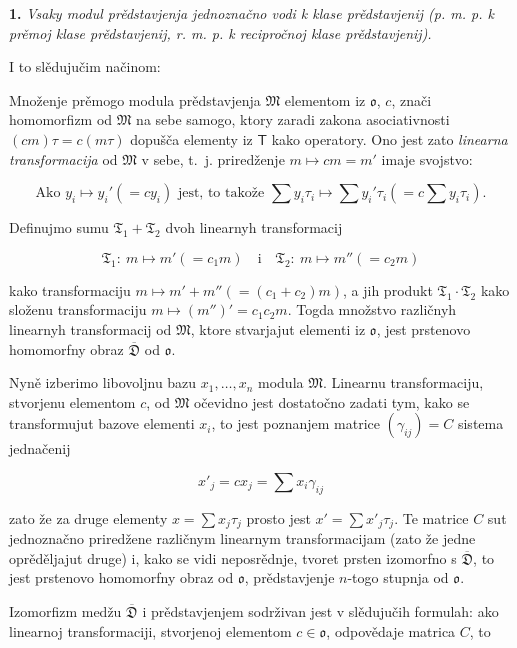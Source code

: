 \documentclass[11pt]{article}
\begin{document}
\textbf{1.} \emph{Vsaky modul prědstavjenja jednoznačno vodi k klase prědstavjenij (p. m. p. k prěmoj klase prědstavjenij, r. m. p. k recipročnoj klase prědstavjenij).}

I to slědujučim načinom:

Množenje prěmogo modula prědstavjenja \(\mathfrak M\) elementom iz \(\mathfrak{o}\), \(c\), znači homomorfizm od \(\mathfrak M\) na sebe samogo, ktory zaradi zakona asociativnosti \((cm)\tau=c(m\tau)\) dopušča elementy iz \(\mathsf T\) kako operatory. Ono jest zato \emph{linearna transformacija} od \(\mathfrak M\) v sebe, t.~j. priredženje \(m\mapsto cm=m'\) imaje svojstvo:

\[
\text{Ako } y_i\mapsto y_i'(=cy_i) \text{ jest, to takože }
\sum y_i\tau_i\mapsto \sum y_i'\tau_i\left(=c\sum y_i\tau_i\right).
\]

Definujmo sumu \(\mathfrak T_1+\mathfrak T_2\) dvoh linearnyh transformacij

\[
\mathfrak T_1:\ m\mapsto m'(=c_1m)
\quad\text{i}\quad
\mathfrak T_2:\ m\mapsto m''(=c_2m)
\]

kako transformaciju \(m\mapsto m'+m''(=(c_1+c_2)m)\), a jih produkt \(\mathfrak T_1\cdot\mathfrak T_2\) kako složenu transformaciju \(m\mapsto (m'')'=c_1c_2m\). Togda množstvo različnyh linearnyh transformacij od \(\mathfrak M\), ktore stvarjajut elementi iz \(\mathfrak{o}\), jest prstenovo homomorfny obraz \(\overline{\mathfrak D}\) od \(\mathfrak{o}\).

Nyně izberimo libovoljnu bazu \(x_1,\ldots,x_n\) modula \(\mathfrak M\). Linearnu transformaciju, stvorjenu elementom \(c\), od \(\mathfrak M\) očevidno jest dostatočno zadati tym, kako se transformujut bazove elementi \(x_i\), to jest poznanjem matrice \((\gamma_{ij})=C\) sistema jednačenij

\[
x'_j=cx_j=\sum x_i\gamma_{ij}
\]

zato že za druge elementy \(x=\sum x_j\tau_j\) prosto jest \(x'=\sum x'_j\tau_j\). Te matrice \(C\) sut jednoznačno priredžene različnym linearnym transformacijam (zato že jedne oprěděljajut druge) i, kako se vidi neposrědnje, tvoret prsten izomorfno s \(\overline{\mathfrak D}\), to jest prstenovo homomorfny obraz od \(\mathfrak{o}\), prědstavjenje \(n\)-togo stupnja od \(\mathfrak{o}\).

Izomorfizm medžu \(\overline{\mathfrak D}\) i prědstavjenjem sodrživan jest v slědujučih formulah: ako linearnoj transformaciji, stvorjenoj elementom \(c\in\mathfrak{o}\), odpovědaje matrica \(C\), to
\end{document}
